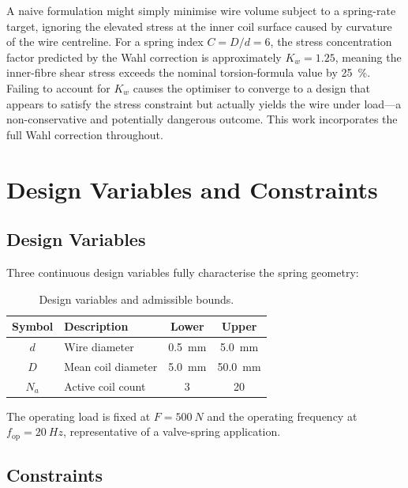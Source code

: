 \documentclass[10pt,twocolumn]{article}
\begin{document}
A naive formulation might simply minimise wire volume subject to a spring-rate
target, ignoring the elevated stress at the inner coil surface caused by
curvature of the wire centreline.
For a spring index $C = D/d = 6$, the stress concentration factor predicted
by the Wahl correction \cite{wahl1963} is approximately $K_w = 1.25$, meaning
the inner-fibre shear stress exceeds the nominal torsion-formula value by
\SI{25}{\percent}.
Failing to account for $K_w$ causes the optimiser to converge to a design
that appears to satisfy the stress constraint but actually yields the wire
under load---a non-conservative and potentially dangerous outcome.
This work incorporates the full Wahl correction throughout.

\section{Design Variables and Constraints}

\subsection{Design Variables}

Three continuous design variables fully characterise the spring geometry:

\begin{table}[H]
  \centering
  \caption{Design variables and admissible bounds.}
  \label{tab:dv}
  \small
  \begin{tabular}{@{}clcc@{}}
    \toprule
    Symbol & Description & Lower & Upper \\
    \midrule
    $d$   & Wire diameter          & \SI{0.5}{mm} & \SI{5.0}{mm} \\
    $D$   & Mean coil diameter     & \SI{5.0}{mm} & \SI{50.0}{mm} \\
    $N_a$ & Active coil count      & 3            & 20 \\
    \bottomrule
  \end{tabular}
\end{table}

The operating load is fixed at $F = \SI{500}{N}$ and the operating frequency
at $f_{\text{op}} = \SI{20}{Hz}$, representative of a valve-spring application.

\subsection{Constraints}
\end{document}
